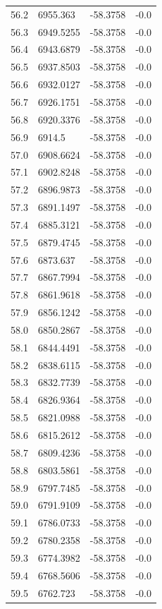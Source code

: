 \begin{table}[H]
\begin{tabular}{llll}
56.2 & 6955.363 & -58.3758 & -0.0 \\
56.3 & 6949.5255 & -58.3758 & -0.0 \\
56.4 & 6943.6879 & -58.3758 & -0.0 \\
56.5 & 6937.8503 & -58.3758 & -0.0 \\
56.6 & 6932.0127 & -58.3758 & -0.0 \\
56.7 & 6926.1751 & -58.3758 & -0.0 \\
56.8 & 6920.3376 & -58.3758 & -0.0 \\
56.9 & 6914.5 & -58.3758 & -0.0 \\
57.0 & 6908.6624 & -58.3758 & -0.0 \\
57.1 & 6902.8248 & -58.3758 & -0.0 \\
57.2 & 6896.9873 & -58.3758 & -0.0 \\
57.3 & 6891.1497 & -58.3758 & -0.0 \\
57.4 & 6885.3121 & -58.3758 & -0.0 \\
57.5 & 6879.4745 & -58.3758 & -0.0 \\
57.6 & 6873.637 & -58.3758 & -0.0 \\
57.7 & 6867.7994 & -58.3758 & -0.0 \\
57.8 & 6861.9618 & -58.3758 & -0.0 \\
57.9 & 6856.1242 & -58.3758 & -0.0 \\
58.0 & 6850.2867 & -58.3758 & -0.0 \\
58.1 & 6844.4491 & -58.3758 & -0.0 \\
58.2 & 6838.6115 & -58.3758 & -0.0 \\
58.3 & 6832.7739 & -58.3758 & -0.0 \\
58.4 & 6826.9364 & -58.3758 & -0.0 \\
58.5 & 6821.0988 & -58.3758 & -0.0 \\
58.6 & 6815.2612 & -58.3758 & -0.0 \\
58.7 & 6809.4236 & -58.3758 & -0.0 \\
58.8 & 6803.5861 & -58.3758 & -0.0 \\
58.9 & 6797.7485 & -58.3758 & -0.0 \\
59.0 & 6791.9109 & -58.3758 & -0.0 \\
59.1 & 6786.0733 & -58.3758 & -0.0 \\
59.2 & 6780.2358 & -58.3758 & -0.0 \\
59.3 & 6774.3982 & -58.3758 & -0.0 \\
59.4 & 6768.5606 & -58.3758 & -0.0 \\
59.5 & 6762.723 & -58.3758 & -0.0 \\

\end{tabular}
\end{table}
